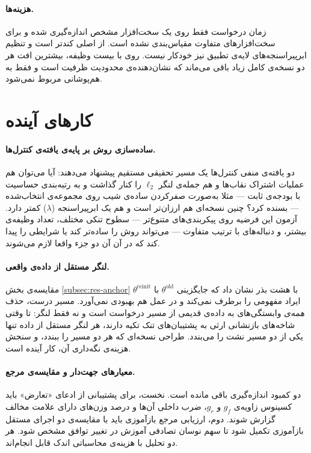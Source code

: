 \paragraph{هزینه‌ها.} زمان درخواست فقط روی یک سخت‌افزار مشخص اندازه‌گیری شده و برای سخت‌افزارهای متفاوت مقیاس‌بندی نشده است.  از  اصلی کندتر است و تنظیم ابرپیراسنجه‌های لایه‌ی تطبیق نیز خودکار نیست. روی  با بیست وظیفه، بیشترین افت هر دو نسخه‌ی کامل زیاد باقی می‌ماند که نشان‌دهنده‌ی محدودیت ظرفیت است و فقط به هم‌پوشانی مربوط نمی‌شود.

\section{کارهای آینده}
\label{sec:concl-future}

\paragraph{ساده‌سازی روش بر پایه‌ی یافته‌ی کنترل‌ها.} دو یافته‌ی منفی کنترل‌ها یک مسیر تحقیقی مستقیم پیشنهاد می‌دهند: آیا می‌توان هم عملیات اشتراک نقاب‌ها و هم جمله‌ی لنگر $\ell_2$ را کنار گذاشت و به رتبه‌بندی حساسیت با بودجه‌ی ثابت — مثلا به‌صورت صفرکردن ساده‌ی شیب روی مجموعه‌ی انتخاب‌شده — بسنده کرد؟ چنین نسخه‌ای هم ارزان‌تر است و هم یک ابرپیراسنجه ($\lambda$) کمتر دارد. آزمون این فرضیه روی پیکربندی‌های متنوع‌تر — سطوح تنکی مختلف، تعداد وظیفه‌ی بیشتر، و دنباله‌های با ترتیب متفاوت — می‌تواند روش را ساده‌تر کند یا شرایطی را پیدا کند که در آن آن دو جزء واقعا لازم می‌شوند.

\paragraph{لنگر مستقل از داده‌ی واقعی.} مقایسه‌ی بخش \ref{subsec:res-anchor} با هشت بذر نشان داد که جایگزینی $\theta^{\mathrm{old}}$ با $\theta^{\mathrm{reinit}}$ ایراد مفهومی را برطرف نمی‌کند و در عمل هم بهبودی نمی‌آورد. مسیر درست، حذف \emph{همه‌ی} وابستگی‌های به داده‌ی قدیمی از مسیر درخواست است و نه فقط لنگر: تا وقتی شاخه‌های بازنشانی ارثی به پشتیبان‌های تنک تکیه دارند، هر لنگر مستقل از داده تنها یکی از دو مسیر نشت را می‌بندد. طراحی نسخه‌ای که هر دو مسیر را ببندد، و سنجش هزینه‌ی نگه‌داری آن، کار آینده است.

\paragraph{معیارهای جهت‌دار و مقایسه‌ی مرجع.} دو کمبود اندازه‌گیری باقی مانده است. نخست، برای پشتیبانی از ادعای «تعارض» باید کسینوس زاویه‌ی $g_f$ و $g_r$، ضرب داخلی آن‌ها و درصد وزن‌های دارای علامت مخالف گزارش شوند. دوم، ارزیابی مرجع بازآموزی باید با مقایسه‌ی دو اجرای مستقل بازآموزی تکمیل شود تا سهم نوسان تصادفی آموزش در تغییر توافق مشخص شود. هر دو تحلیل با هزینه‌ی محاسباتی اندک قابل انجام‌اند.

